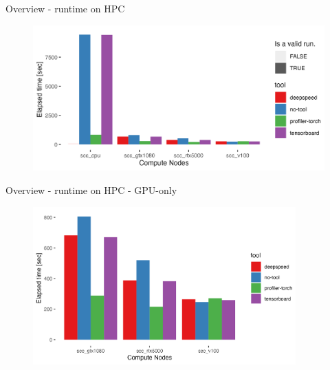 \documentclass[compress,aspectratio=169]{beamer}
\begin{document}
\begin{frame}{Overview - runtime on HPC}
    \vspace{-1.35em}
    \begin{center}
    \begin{figure}
        \includegraphics[width=1\textwidth]{../../data/sacct_barplot_by_nodes_no-experiment}
    \end{figure}
    \end{center}
\end{frame}

\begin{frame}{Overview - runtime on HPC - GPU-only}
    \vspace{-1.35em}
    \begin{center}
    \begin{figure}
        \includegraphics[width=0.9\textwidth]{../../data/sacct_barplot_by_nodes_no-experiment_gpu}
    \end{figure}
    \end{center}
\end{frame}
\end{document}
